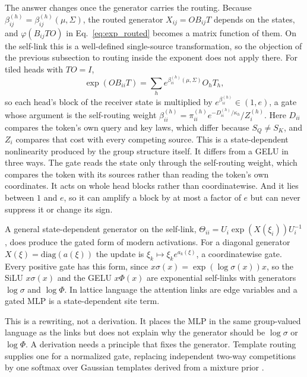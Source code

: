\documentclass[11pt]{article}
\theoremstyle{definition}
\theoremstyle{remark}
\begin{document}
The answer changes once the generator carries the routing. Because $\beta_{ij}^{(h)}=\beta_{ij}^{(h)}(\mu,\Sigma)$, the routed generator $X_{ij}=OB_{ij}T$ depends on the states, and $\varphi(B_{ij}TO)$ in Eq.~\eqref{eq:exp_routed} becomes a matrix function of them. On the self-link this is a well-defined single-source transformation, so the objection of the previous subsection to routing inside the exponent does not apply there. For tiled heads with $TO=I$,
\begin{equation}
\exp(OB_{ii}T)=\sum_he^{\beta_{ii}^{(h)}(\mu,\Sigma)}O_hT_h,
\label{eq:self_gate}
\end{equation}
so each head's block of the receiver state is multiplied by $e^{\beta_{ii}^{(h)}}\in(1,e)$, a gate whose argument is the self-routing weight $\beta_{ii}^{(h)}=\pi_{ii}^{(h)}e^{-D_{ii}^{(h)}/\kappa_h}/Z_i^{(h)}$. Here $D_{ii}$ compares the token's own query and key laws, which differ because $S_Q\ne S_K$, and $Z_i$ compares that cost with every competing source. This is a state-dependent nonlinearity produced by the group structure itself. It differs from a GELU in three ways. The gate reads the state only through the self-routing weight, which compares the token with its sources rather than reading the token's own coordinates. It acts on whole head blocks rather than coordinatewise. And it lies between $1$ and $e$, so it can amplify a block by at most a factor of $e$ but can never suppress it or change its sign.

A general state-dependent generator on the self-link, $\Theta_{ii}=U_i\exp(X(\xi_i))U_i^{-1}$, does produce the gated form of modern activations. For a diagonal generator $X(\xi)=\mathrm{diag}(a(\xi))$ the update is $\xi_k\mapsto\xi_ke^{a_k(\xi)}$, a coordinatewise gate. Every positive gate has this form, since $x\sigma(x)=\exp(\log\sigma(x))x$, so the SiLU $x\sigma(x)$ \cite{elfwing2018silu} and the GELU $x\Phi(x)$ \cite{hendrycks2016gelu} are exponential self-links with generators $\log\sigma$ and $\log\Phi$. In lattice language the attention links are edge variables and a gated MLP is a state-dependent site term.

This is a rewriting, not a derivation. It places the MLP in the same group-valued language as the links but does not explain why the generator should be $\log\sigma$ or $\log\Phi$. A derivation needs a principle that fixes the generator. Template routing supplies one for a normalized gate, replacing independent two-way competitions by one softmax over Gaussian templates derived from a mixture prior \cite{dennis2026template}.
\end{document}
